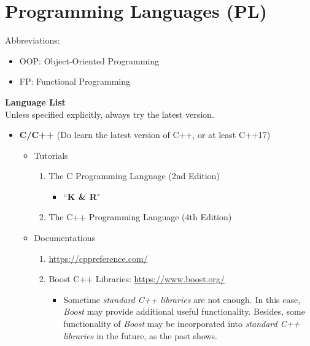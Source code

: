 \documentclass{article}
\begin{document}
\section{Programming Languages (PL)}
Abbreviations:
\begin{itemize}
    \item OOP: Object-Oriented Programming
    \item FP: Functional Programming
\end{itemize}
\textbf{Language List}\\
Unless specified explicitly, always try the latest version.
\begin{itemize}
    \item \textbf{C/C++} (Do learn the latest version of C++, or at least C++17)
    \begin{itemize}
        \item Tutorials
        \begin{enumerate}
            \item The C Programming Language (2nd Edition) \cite{ritchie1988c}
            \begin{itemize}
                \item ``\textbf{K \& R}"
            \end{itemize}
            \item The C++ Programming Language (4th Edition) \cite{stroustrup2013c++}
        \end{enumerate}
        \item Documentations
        \begin{enumerate}
            \item \href{https://cppreference.com/}{https://cppreference.com/}
            \item Boost C++ Libraries:
            \href{https://www.boost.org/}{https://www.boost.org/}
        \begin{itemize}
            \item Sometime \emph{standard C++ libraries} are not enough.
            In this case, \emph{Boost} may provide additional useful functionality.
            Besides, some functionality of \emph{Boost} may be incorporated into \emph{standard C++ libraries} in the future, as the past shows.
        \end{itemize}
        \end{enumerate}


\end{itemize}
\end{itemize}
\end{document}
